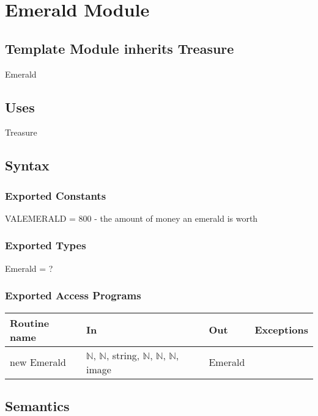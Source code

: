 \documentclass[12pt]{article}
\begin{document}
\newpage

\section*{Emerald Module}

\subsection*{Template Module inherits Treasure}

Emerald

\subsection*{Uses}

Treasure

\subsection*{Syntax}

\subsubsection*{Exported Constants}

VALEMERALD = $800$ - the amount of money an emerald is worth

\subsubsection*{Exported Types}

Emerald = ?

\subsubsection*{Exported Access Programs}

\begin{tabular}{| l | l | l | l |}
\hline
\textbf{Routine name} & \textbf{In} & \textbf{Out} & \textbf{Exceptions}\\
\hline
new Emerald & $\mathbb{N}$, $\mathbb{N}$, string, $\mathbb{N}$, $\mathbb{N}$, $\mathbb{N}$, image & Emerald & ~\\
\hline
\end{tabular}

\subsection*{Semantics}
\end{document}
